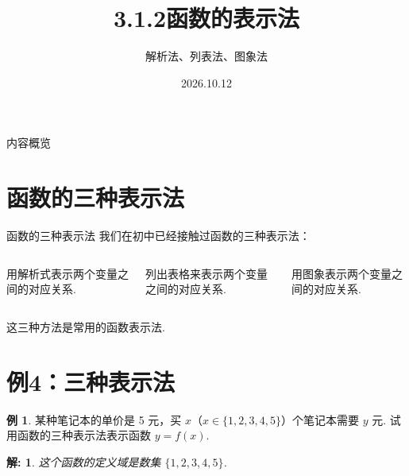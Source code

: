 \documentclass[aspectratio=169,13pt,t] {beamer}
\title[3.1.2函数的表示法]{3.1.2函数的表示法}
\subtitle{解析法、列表法、图象法}
\author[好好学习，努力向上]{}
\institute{}
\date{2026.10.12}
\newtheorem*{solve}{解:}
\theoremstyle{definition}
\newtheorem{exam}{例}
\begin{document}
\begin{frame}{}
	\titlepage
\end{frame}

\begin{frame}{内容概览}
	\tableofcontents
\end{frame}

\section{函数的三种表示法}

\begin{frame}{函数的三种表示法}
	我们在初中已经接触过函数的三种表示法：
	\begin{columns}
		\begin{summarybox}[解析法]
			用解析式表示两个变量之间的对应关系.
		\end{summarybox}
		\begin{summarybox}[列表法]
			列出表格来表示两个变量之间的对应关系.
		\end{summarybox}
		\begin{summarybox}[图象法]
			用图象表示两个变量之间的对应关系.
		\end{summarybox}
	\end{columns}
	\vspace{1em}
	\begin{summarybox-answer}
		这三种方法是常用的函数表示法.
	\end{summarybox-answer}
\end{frame}

\section{例4：三种表示法}

\begin{frame}%
	\setcounter{exam}{3}
	
	\begin{exam}
	某种笔记本的单价是 5 元，买 \(x\)（\(x \in \{1, 2, 3, 4, 5\}\)）个笔记本需要 \(y\) 元. 试用函数的三种表示法表示函数 \(y = f(x)\).
	\end{exam}
	\pause
	\begin{solve}
		这个函数的定义域是数集 \(\{1, 2, 3, 4, 5\}\).
	\end{solve}
\end{frame}
\end{document}
